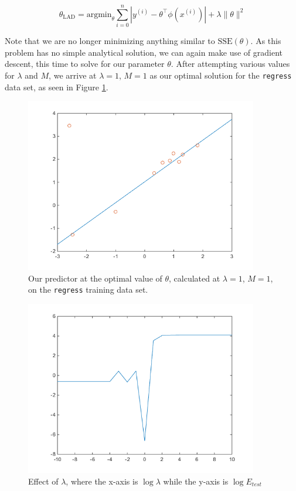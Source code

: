 \documentclass[10pt,letterpaper]{article}
\begin{document}
$$\theta_{\text{LAD}} = \text{argmin}_\theta\sum_{i=0}^n|y^{(i)} - \theta^\intercal\phi(x^{(i)})| + \lambda\lVert\theta\rVert^2$$

Note that we are no longer minimizing anything similar to $\text{SSE}(\theta)$. As this problem has no simple analytical solution, we can again make use of gradient descent, this time to solve for our parameter $\theta$. After attempting various values for $\lambda$ and $M$, we arrive at $\lambda = 1$, $M=1$ as our optimal solution for the \texttt{regress} data set, as seen in Figure \ref{fig:line}.

\begin{figure}[!htb]
\begin{center}
\includegraphics[width=4in]{figures/line.png}
\caption{Our predictor at the optimal value of $\theta$, calculated at $\lambda=1$, $M=1$, on the \texttt{regress} training data set.}\label{fig:line}
\end{center}
\end{figure}

\begin{figure}[!htb]
\begin{center}
\includegraphics[width=4in]{figures/lambdaline.png}
\caption{Effect of $\lambda$, where the x-axis is $\log \lambda$ while the y-axis is $\log E_{test}$}\label{fig:lambdaline}
\end{center}
\end{figure}
\end{document}
